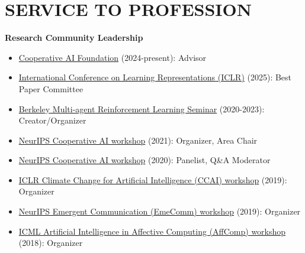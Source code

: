 \documentclass[paper=letter,fontsize=11pt]{scrartcl} %
\newcommand{\NewPart}[2]{\section*{\uppercase{#1} #2}}
\newcommand{\CommitteeEntry}[4]{
		\noindent \href{#4}{#1} (#2): #3}
\begin{document}

\NewPart{Service to Profession}{}
\textbf{Research Community Leadership}
\begin{itemize}
    \item \CommitteeEntry{Cooperative AI Foundation}{2024-present}{Advisor}{https://www.cooperativeai.com/foundation\#Staff}
    \item \CommitteeEntry{International Conference on Learning Representations (ICLR)}{2025}{Best Paper Committee}{https://blog.iclr.cc/2025/04/22/announcing-the-outstanding-paper-awards-at-iclr-2025/}
    \item \CommitteeEntry{Berkeley Multi-agent Reinforcement Learning Seminar}{2020-2023}{Creator/Organizer}{https://sites.google.com/corp/view/berkeleymarl/home}
    \item \CommitteeEntry{NeurIPS Cooperative AI workshop}{2021}{Organizer, Area Chair}{https://www.cooperativeai.com/neurips-2021/workshop-information}
    \item \CommitteeEntry{NeurIPS Cooperative AI workshop}{2020}{Panelist, Q\&A Moderator}{https://www.cooperativeai.com/neurips-2020/speakers}
    \item \CommitteeEntry{ICLR Climate Change for Artificial Intelligence (CCAI) workshop}{2019}{Organizer}{https://www.climatechange.ai/events/iclr2020.html}
    \item \CommitteeEntry{NeurIPS Emergent Communication (EmeComm) workshop}{2019}{Organizer}{https://sites.google.com/corp/view/emecom2019/home}
    \item \CommitteeEntry{ICML Artificial Intelligence in Affective Computing (AffComp) workshop}{2018}{Organizer}{https://icml.cc/Conferences/2018/Schedule?showEvent=3304}
\end{itemize}
\end{document}
